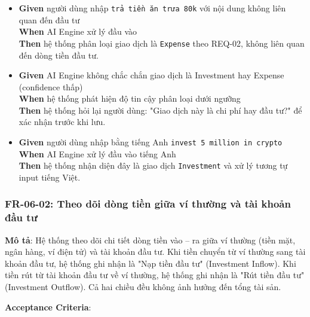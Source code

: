 \begin{itemize}
\item \textbf{Given} người dùng nhập \texttt{trả tiền ăn trưa 80k} với nội dung không liên quan đến đầu tư  \\ \hspace*{1.5em}  \textbf{When} AI Engine xử lý đầu vào  \\ \hspace*{1.5em}  \textbf{Then} hệ thống phân loại giao dịch là \texttt{Expense} theo REQ-02, không liên quan đến dòng tiền đầu tư.
\item \textbf{Given} AI Engine không chắc chắn giao dịch là Investment hay Expense (confidence thấp)  \\ \hspace*{1.5em}  \textbf{When} hệ thống phát hiện độ tin cậy phân loại dưới ngưỡng  \\ \hspace*{1.5em}  \textbf{Then} hệ thống hỏi lại người dùng: "Giao dịch này là chi phí hay đầu tư?" để xác nhận trước khi lưu.
\item \textbf{Given} người dùng nhập bằng tiếng Anh \texttt{invest 5 million in crypto}  \\ \hspace*{1.5em}  \textbf{When} AI Engine xử lý đầu vào tiếng Anh  \\ \hspace*{1.5em}  \textbf{Then} hệ thống nhận diện đây là giao dịch \texttt{Investment} và xử lý tương tự input tiếng Việt.
\end{itemize}
\subsubsection{FR-06-02: Theo dõi dòng tiền giữa ví thường và tài khoản đầu tư}

\textbf{Mô tả}: Hệ thống theo dõi chi tiết dòng tiền vào – ra giữa ví thường (tiền mặt, ngân hàng, ví điện tử) và tài khoản đầu tư. Khi tiền chuyển từ ví thường sang tài khoản đầu tư, hệ thống ghi nhận là "Nạp tiền đầu tư" (Investment Inflow). Khi tiền rút từ tài khoản đầu tư về ví thường, hệ thống ghi nhận là "Rút tiền đầu tư" (Investment Outflow). Cả hai chiều đều không ảnh hưởng đến tổng tài sản.



\textbf{Acceptance Criteria}:

